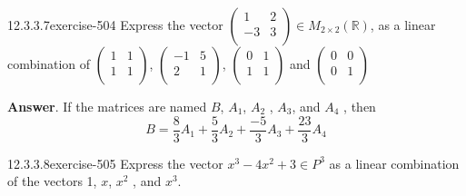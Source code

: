 \documentclass[twoside,10pt,]{book}
\numberwithin{equation}{section}
\begin{document}
\begin{divisionsolution}{12.3.3.7}{}{exercise-504}%
\hypertarget{p-4533}{}%
Express the vector  \(\left(
\begin{array}{cc}
1 & 2 \\
-3 & 3 \\
\end{array}
\right)\in M_{2\times 2}(\mathbb{R})\), as a linear combination of \(\left(
\begin{array}{cc}
1 & 1 \\
1 & 1 \\
\end{array}
\right)\),   \(\left(
\begin{array}{cc}
-1 & 5 \\
2 & 1 \\
\end{array}
\right)\),  \(\left(
\begin{array}{cc}
0 & 1 \\
1 & 1 \\
\end{array}
\right)\)  and \(\left(
\begin{array}{cc}
0 & 0 \\
0 & 1 \\
\end{array}
\right)\)%
\par\smallskip%
\noindent\textbf{Answer}.\quad%
\hypertarget{p-4534}{}%
If the matrices are named \(B\), \(A_1\), \(A_2\) , \(A_3\), and \(A_4\) , then%
\begin{equation*}
B = \frac{8}{3}A_1 + \frac{5}{3}A_2+\frac{-5}{3}A_3+\frac{23}{3}A_4
\end{equation*}
%
\end{divisionsolution}%
\begin{divisionsolution}{12.3.3.8}{}{exercise-505}%
\hypertarget{p-4535}{}%
Express the vector \(x^3-4x^2+3\in P^3\) as a linear combination of the vectors 1, \(x\), \(x^2\) , and \(x^3\).%
\end{divisionsolution}%
\end{document}
